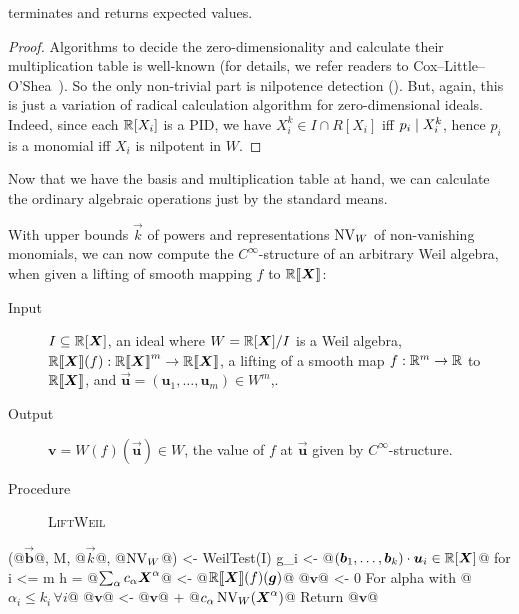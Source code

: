 \begin{theorem}
   terminates and returns expected values.
\end{theorem}
\begin{proof}
  Algorithms to decide the zero-dimensionality and calculate their multiplication table is well-known (for details, we refer readers to Cox--Little--O'Shea~\cite[Chapter 2]{CLO:2005}).
  So the only non-trivial part is nilpotence detection ().
  But, again, this is just a variation of radical calculation algorithm for zero-dimensional ideals.
  Indeed, since each $\mathbb{R}[X_i]$ is a PID, we have $X_i^k \in I \cap R[X_i]$ iff $p_i \mathrel{\mid} X_i^k$, hence $p_i$ is a monomial iff $X_i$ is nilpotent in $W$.
\end{proof}
Now that we have the basis and multiplication table at hand, we can calculate the ordinary algebraic operations just by the standard means.

With upper bounds $\vec k$ of powers and representations $\operatorname{NV}_W$ of non-vanishing monomials, we can now compute the $C^\infty$-structure of an arbitrary Weil algebra, when given a lifting of smooth mapping $f$ to $\mathord{\mathbb{R}\llbracket\boldsymbol{X}\rrbracket}$:

\begin{algorithm}\label{alg:smooth-weil}
  \hfill\vspace{-.25em}
  \begin{description}
    \item[Input]
      $I \subseteq \mathbb{R}[\boldsymbol{X}]$, an ideal where $W = \mathbb{R}[\boldsymbol{X}]/I$ is a Weil algebra,
      $\mathbb{R} \llbracket\boldsymbol{X}\rrbracket(f): \mathord{\mathbb{R}\llbracket\boldsymbol{X}\rrbracket}^m \to \mathord{\mathbb{R}\llbracket\boldsymbol{X}\rrbracket}$, a lifting of a smooth map $f: \mathbb{R}^m \to \mathbb{R}$ to $\mathord{\mathbb{R}\llbracket\boldsymbol{X}\rrbracket}$, and $\vec{\boldsymbol{u}} = (\boldsymbol{u}_1, \dots, \boldsymbol{u}_m) \in W^m$,.
    \item[Output] $\boldsymbol{v} = W(f)(\vec{\boldsymbol u}) \in W$, the value of $f$ at $\vec{\boldsymbol{u}}$ given by $C^\infty$-structure.
    \item[Procedure] \textup{\textsc{LiftWeil}}
  \end{description}
\begin{alg}
(@$\vec{\boldsymbol{b}}$@, M, @$\vec{k}$@, @$\operatorname{NV}_W$@) <- WeilTest(I)
g_i <- @$(\boldsymbol{b}_1, \dots, \boldsymbol{b}_k) \cdot \boldsymbol{u}_i \in \mathbb{R}[\boldsymbol{X}]$@ for i <= m
h = @$\sum_\alpha c_\alpha \boldsymbol{X}^\alpha$@ <- @$\Rseries(f)(\vec{g})$@
@$\boldsymbol v$@ <- 0
For alpha with @$\alpha_i \leq k_i\, \forall i$@
  @$\boldsymbol{v}$@ <- @$\boldsymbol v$@ + @$c_\alpha \operatorname{NV}_W(\boldsymbol{X}^\alpha)$@
Return @$\boldsymbol{v}$@
\end{alg}
\end{algorithm}

